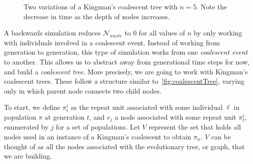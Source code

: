 \begin{figure}[t]
    \centering
    \subfloat{}
    \qquad \qquad \qquad
    \subfloat{}
    \caption{Two variations of a Kingman's coalescent tree with $n = 5$.
    Note the decrease in time as the depth of nodes increases.}
    \label{fig:coalescentTree}
\end{figure}

A backwards simulation reduces $\mathcal{N}_{waste}$ to 0 for all values of $n$ by only working with individuals
involved in a coalescent event.
Instead of working from generation to generation, this type of simulation works from one \emph{coalescent event} to
another.
This allows us to abstract away from generational time steps for now, and build a \emph{coalescent tree}.
More precisely, we are going to work with Kingman's coalescent trees.
These follow a structure similar to~\autoref{fig:coalescentTree}, varying only in which parent node connects two child
nodes.

To start, we define $\pi_t^i$ as the repeat unit associated with some individual $\ell$ in population $\pi$ at
generation $t$, and $v_j$ a node associated with some repeat unit $\pi_t^i$, enumerated by $j$ for a set of
populations.
Let $V$ represent the set that holds all nodes used in an instance of a Kingman's coalescent to obtain $\pi_n$.
$V$ can be thought of as all the nodes associated with the evolutionary tree, or graph, that we are building.


